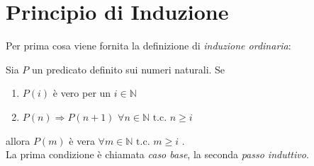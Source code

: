 \chapter{Principio di Induzione}


Per prima cosa viene fornita la definizione di \emph{induzione ordinaria}:
\begin{defn}
	Sia $P$ un predicato definito sui numeri naturali. Se
	\begin{enumerate}
		\item $P(i)$ è vero per un $i \in \mathbb{N}$
		\item $ P(n) \Rightarrow P(n+1) $  $\forall n \in \mathbb{N} \text{ t.c. }  n \geq i$
	\end{enumerate}
	allora $P(m)$ è vera $\forall m \in \mathbb{N} \text{ t.c. }  m \geq i$ .\\
	La prima condizione è chiamata \emph{caso base}, la seconda \emph{passo induttivo}.
\end{defn}

